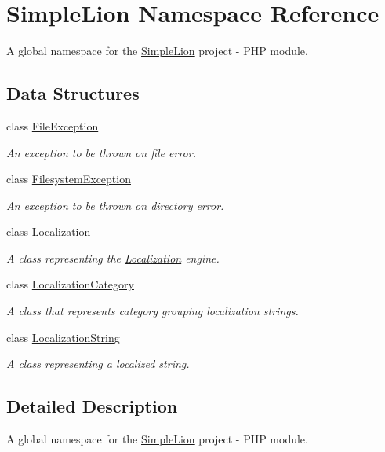 \hypertarget{namespace_simple_lion}{\section{Simple\-Lion Namespace Reference}
\label{namespace_simple_lion}
}


A global namespace for the \hyperlink{namespace_simple_lion}{Simple\-Lion} project -\/ P\-H\-P module.  


\subsection*{Data Structures}
\begin{DoxyCompactItemize}
\item 
class \hyperlink{class_simple_lion_1_1_file_exception}{File\-Exception}
\begin{DoxyCompactList}\small\item\em An exception to be thrown on file error. \end{DoxyCompactList}\item 
class \hyperlink{class_simple_lion_1_1_filesystem_exception}{Filesystem\-Exception}
\begin{DoxyCompactList}\small\item\em An exception to be thrown on directory error. \end{DoxyCompactList}\item 
class \hyperlink{class_simple_lion_1_1_localization}{Localization}
\begin{DoxyCompactList}\small\item\em A class representing the \hyperlink{class_simple_lion_1_1_localization}{Localization} engine. \end{DoxyCompactList}\item 
class \hyperlink{class_simple_lion_1_1_localization_category}{Localization\-Category}
\begin{DoxyCompactList}\small\item\em A class that represents category grouping localization strings. \end{DoxyCompactList}\item 
class \hyperlink{class_simple_lion_1_1_localization_string}{Localization\-String}
\begin{DoxyCompactList}\small\item\em A class representing a localized string. \end{DoxyCompactList}\end{DoxyCompactItemize}


\subsection{Detailed Description}
A global namespace for the \hyperlink{namespace_simple_lion}{Simple\-Lion} project -\/ P\-H\-P module. 
